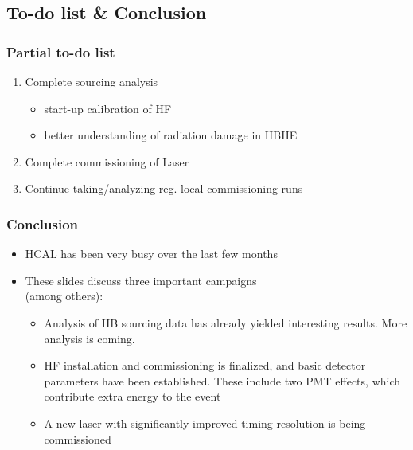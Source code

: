 \documentclass[bigger]{beamer}
\begin{document}
\subsection{To-do list \& Conclusion}
\label{sec-5-1}
\begin{frame}
\frametitle{Partial to-do list}
\label{sec-5-1-1}

\begin{enumerate}
\item Complete sourcing analysis
\begin{itemize}
\item start-up calibration of HF
\item better understanding of radiation damage in HBHE
\end{itemize}
\item Complete commissioning of Laser
\item Continue taking/analyzing reg. local commissioning runs
\end{enumerate}
\end{frame}
\begin{frame}
\frametitle{Conclusion}
\label{sec-5-1-2}
\begin{itemize}

\item HCAL has been very busy over the last few months
\label{sec-5-1-2-1}%

\item These slides discuss three important campaigns \\ (among others):
\label{sec-5-1-2-2}%
\begin{itemize}

\item Analysis of HB sourcing data has already yielded interesting results.  More analysis is coming.
\label{sec-5-1-2-2-1}%

\item HF installation and commissioning is finalized, and basic detector parameters have been established.  These include two PMT effects, which contribute  extra energy to the event
\label{sec-5-1-2-2-2}%

\item A new laser with significantly improved timing resolution is being commissioned
\label{sec-5-1-2-2-3}%
\end{itemize} %
\end{itemize} %
\end{frame}
\end{document}
